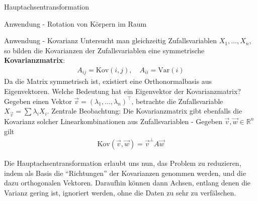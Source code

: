 \documentclass{report}
\newcommand{\tbf}[1]{\textbf{#1}}
\newcommand{\bR}{\mathbb{R}}
\newcommand{\vv}{\vec{v}}
\newcommand{\vw}{\vec{w}}
\begin{document}
\begin{section}{Hauptachsentransformation}
\begin{subsection}{Anwendung - Rotation von Körpern im Raum}
 \end{subsection}
 \begin{subsection}{Anwendung - Kovarianz}
  Untersucht man gleichzeitig Zufallsvariablen $X_1, \hdots, X_n$, so bilden die Kovarianzen der Zufallsvariablen eine symmetrische \tbf{Kovarianzmatrix}:
  \begin{align*}
   A_{ij} = \text{Kov}(i,j), \quad A_{ii} = \text{Var}(i)
  \end{align*}
Da die Matrix symmetrisch ist, existiert eine Orthonormalbasis aus Eigenvektoren. Welche Bedeutung hat ein Eigenvektor der Kovarianzmatrix? Gegeben einen Vektor $\vv = (\lambda_1, \hdots, \lambda_n)^\top$, betrachte die Zufallsvariable $X_{\vv} = \sum \lambda_i X_i$. Zentrale Beobachtung: Die Kovarianzmatrix gibt ebenfalls die Kovarianz solcher Linearkombinationen aus Zufallsvariablen - Gegeben $\vv, \vw \in \bR^n$ gilt 
  \begin{align*}
   \text{Kov}(\vv, \vw) = \vv^\bot A \vw
  \end{align*}
 \end{subsection}
 Die Hauptachsentransformation erlaubt uns nun, das Problem zu reduzieren, indem als Basis die ``Richtungen'' der Kovarianzen genommen werden, und die dazu orthogonalen Vektoren. Daraufhin können dann Achsen, entlang denen die Varianz gering ist, ignoriert werden, ohne die Daten zu sehr zu verfälschen.
\end{section}
%
%
%
%
%
%
%
%
%
%
%
%
%
%
%
%
%
\end{document}

